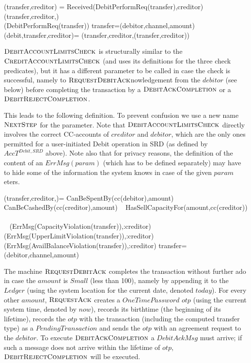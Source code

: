\begin{asm}
(transfer,creditor)  =\+
\IF Received(DebitPerformReq(transfer),\FROM creditor) \THEN \+  
   (transfer,creditor,)\\
   (DebitPerformReq(transfer))\-
\WHERE \+
transfer=(debitor,channel,amount)\\
(debit,transfer,creditor)=\+
(transfer,creditor,(transfer,creditor))
\end{asm}

$\hbox{\sc DebitAccountLimitsCheck}$ is structurally similar to the $\hbox{\sc CreditAccountLimitsCheck}$ (and uses its definitions for the three check predicates), but it has a different parameter to be called in case the check is successful, namely to $\hbox{\sc RequestDebitAck}$nowledgement from the $debitor$ (see below) before completing the transaction by a $\hbox{\sc DebitAckCompletion}$ or a $\hbox{\sc DebitRejectCompletion}$. 

This leads to the following definition. To prevent confusion we use a new name 
$\hbox{\sc NextStep}$ for the parameter. Note that $\hbox{\sc DebitAccountLimitsCheck}$ 
directly involves the correct CC-accounts of $creditor$ and $debitor$, which are 
the only ones permitted for a user-initiated Debit operation in SRD (as defined by $AccT^{Debit,SRD}$ above). Note also that for privacy reasons, the definition of the content of an $ErrMsg(param)$ (which has to be defined separately) may have to hide some of the information the system knows in case of the given $param$eters.


\begin{asm}
(transfer,creditor,)=\+
  \IF CanBeSpentBy(cc(debitor),amount) \+
    \THEN ~ \IF CanBeCashedBy(cc(creditor),amount) \+
       \THEN ~ \IF HasSellCapacityFor(amount,cc(creditor)) \+
           \THEN ~  \\
           \ELSE 
           ~ (ErrMsg(CapacityViolation(transfer)),\TO :creditor)\-
       \ELSE 
       ~ (ErrMsg(UpperLimitViolation(transfer)),\TO :creditor)\-
   \ELSE 
    ~ (ErrMsg(AvailBalanceViolation(transfer)),\TO :creditor)\dec\-
 \WHERE \+
    transfer=(debitor,channel,amount)
\end{asm}


The machine  $\hbox{\sc RequestDebitAck}$ completes the transaction without further 
ado in case  the
$amount$ is $Small$ (less than 100), namely by appending it to the $Ledger$ (using the system location for the current date, denoted $today$). For every other $amount$, $\hbox{\sc RequestAck}$
creates a $OneTimePassword$ $otp$ (using the current system time, denoted by $now$), records its birthtime (the beginning of its lifetime), records the $otp$ with the transaction (including the computed transfer type) as a $PendingTransaction$ and sends the $otp$  with an agreement request to the $debitor$. To execute 
$\hbox{\sc DebitAckCompletion}$ a $DebitAckMsg$ must arrive; if such a message does not arrive within the lifetime of $otp$, $\hbox{\sc DebitRejectCompletion}$ will be executed.

